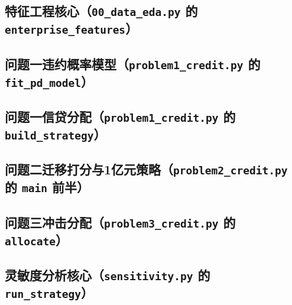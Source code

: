 \documentclass[12pt, a4paper]{article}
\begin{document}
\subsection{特征工程核心（\texttt{00\_data\_eda.py} 的 \texttt{enterprise\_features}）}



\subsection{问题一违约概率模型（\texttt{problem1\_credit.py} 的 \texttt{fit\_pd\_model}）}



\subsection{问题一信贷分配（\texttt{problem1\_credit.py} 的 \texttt{build\_strategy}）}



\subsection{问题二迁移打分与1亿元策略（\texttt{problem2\_credit.py} 的 \texttt{main} 前半）}



\subsection{问题三冲击分配（\texttt{problem3\_credit.py} 的 \texttt{allocate}）}



\subsection{灵敏度分析核心（\texttt{sensitivity.py} 的 \texttt{run\_strategy}）}


\end{document}

